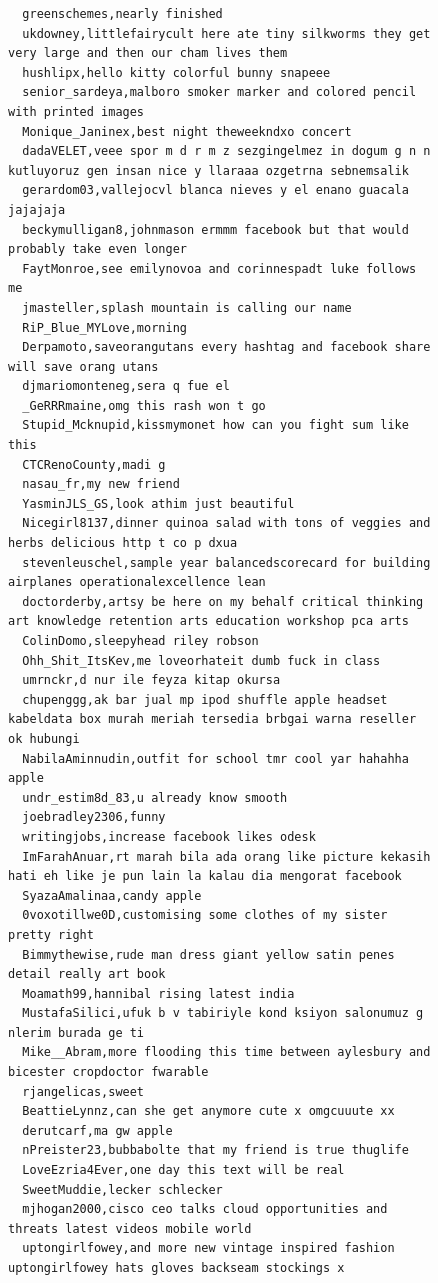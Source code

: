 \begin{figure}[htpb]
\begin{verbatim}
  greenschemes,nearly finished
  ukdowney,littlefairycult here ate tiny silkworms they get very large and then our cham lives them
  hushlipx,hello kitty colorful bunny snapeee
  senior_sardeya,malboro smoker marker and colored pencil with printed images
  Monique_Janinex,best night theweekndxo concert
  dadaVELET,veee spor m d r m z sezgingelmez in dogum g n n kutluyoruz gen insan nice y llaraaa ozgetrna sebnemsalik
  gerardom03,vallejocvl blanca nieves y el enano guacala jajajaja
  beckymulligan8,johnmason ermmm facebook but that would probably take even longer
  FaytMonroe,see emilynovoa and corinnespadt luke follows me
  jmasteller,splash mountain is calling our name
  RiP_Blue_MYLove,morning
  Derpamoto,saveorangutans every hashtag and facebook share will save orang utans
  djmariomonteneg,sera q fue el
  _GeRRRmaine,omg this rash won t go
  Stupid_Mcknupid,kissmymonet how can you fight sum like this
  CTCRenoCounty,madi g
  nasau_fr,my new friend
  YasminJLS_GS,look athim just beautiful
  Nicegirl8137,dinner quinoa salad with tons of veggies and herbs delicious http t co p dxua
  stevenleuschel,sample year balancedscorecard for building airplanes operationalexcellence lean
  doctorderby,artsy be here on my behalf critical thinking art knowledge retention arts education workshop pca arts
  ColinDomo,sleepyhead riley robson
  Ohh_Shit_ItsKev,me loveorhateit dumb fuck in class
  umrnckr,d nur ile feyza kitap okursa
  chupenggg,ak bar jual mp ipod shuffle apple headset kabeldata box murah meriah tersedia brbgai warna reseller ok hubungi
  NabilaAminnudin,outfit for school tmr cool yar hahahha apple
  undr_estim8d_83,u already know smooth
  joebradley2306,funny
  writingjobs,increase facebook likes odesk
  ImFarahAnuar,rt marah bila ada orang like picture kekasih hati eh like je pun lain la kalau dia mengorat facebook
  SyazaAmalinaa,candy apple
  0voxotillwe0D,customising some clothes of my sister pretty right
  Bimmythewise,rude man dress giant yellow satin penes detail really art book
  Moamath99,hannibal rising latest india
  MustafaSilici,ufuk b v tabiriyle kond ksiyon salonumuz g nlerim burada ge ti
  Mike__Abram,more flooding this time between aylesbury and bicester cropdoctor fwarable
  rjangelicas,sweet
  BeattieLynnz,can she get anymore cute x omgcuuute xx
  derutcarf,ma gw apple
  nPreister23,bubbabolte that my friend is true thuglife
  LoveEzria4Ever,one day this text will be real
  SweetMuddie,lecker schlecker
  mjhogan2000,cisco ceo talks cloud opportunities and threats latest videos mobile world
  uptongirlfowey,and more new vintage inspired fashion uptongirlfowey hats gloves backseam stockings x

\end{verbatim}
\end{figure}
